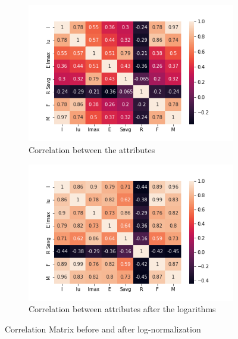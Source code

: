 \begin{figure}
\begin{subfigure}{.49\textwidth}
\centering
\includegraphics[width=.95\textwidth]{img/preparation/features_corr.png}
\caption{Correlation between the attributes}
\label{fig:features_corr}
\end{subfigure}
\begin{subfigure}{.49\textwidth}
\centering
\captionsetup{justification=centering}
\includegraphics[width=.95\textwidth]{img/preparation/features_corr_logs.png}
\caption{Correlation between attributes after the logarithms}
\label{fig:features_corr_logs}
\end{subfigure}
\caption{Correlation Matrix before and after log-normalization}
\end{figure}

